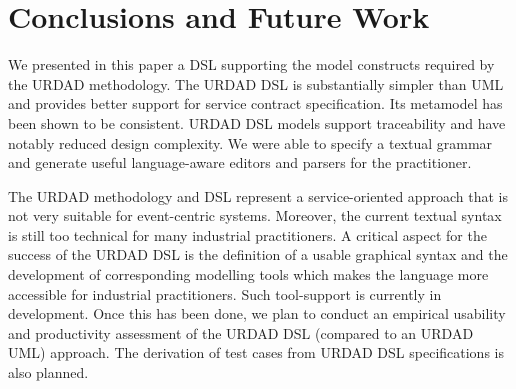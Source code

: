 \section{Conclusions and Future Work \label{sec:conclusionsAndOutlook}}

We presented in this paper a DSL supporting the model constructs required by the URDAD methodology. The URDAD DSL is substantially simpler than UML and provides better support for service contract specification. Its metamodel has been shown to be consistent. URDAD DSL models support traceability and have notably reduced design complexity. We were able to specify a textual grammar and generate useful language-aware editors and parsers for the practitioner.

The URDAD methodology and DSL represent a service-oriented approach that is not very suitable for event-centric systems. Moreover, the current textual syntax is still too technical for many industrial practitioners. A critical aspect for the success of the URDAD DSL is the definition of a usable graphical syntax and the development of corresponding modelling tools which makes the language more accessible for industrial practitioners. Such tool-support is currently in development. Once this has been done, we plan to conduct an empirical usability and productivity assessment of the URDAD DSL (compared to an URDAD UML) approach. The derivation of test cases from URDAD DSL specifications is also planned.

